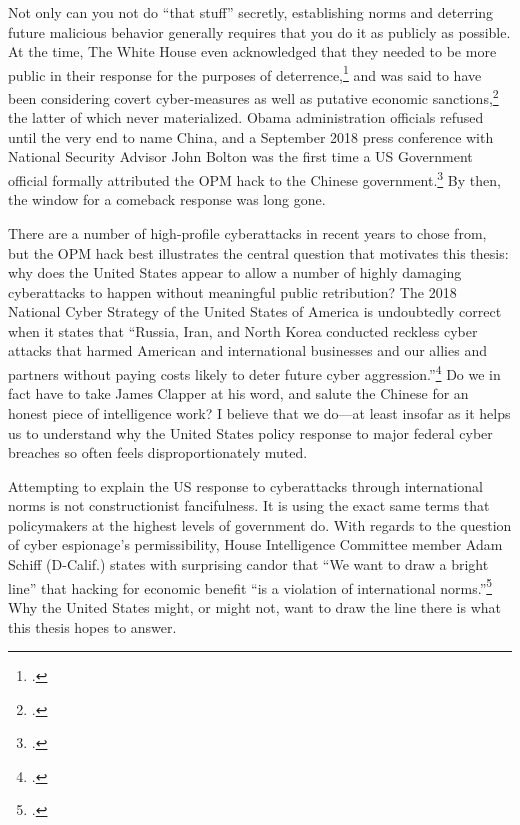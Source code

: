 \documentclass{report}
\begin{document}
\begin{refsegment}
Not only can you not do ``that stuff'' secretly, establishing norms and deterring future malicious behavior generally requires that you do it as publicly as possible. At the time, The White House even acknowledged that they needed to be more public in their response for the purposes of deterrence,\footcite{sanger_u.s._2017} and was said to have been considering covert cyber-measures as well as putative economic sanctions,\footcite{nakashima_hacks_2015} the latter of which never materialized. Obama administration officials refused until the very end to name China, and a September 2018 press conference with National Security Advisor John Bolton was the first time a US Government official formally attributed the OPM hack to the Chinese government.\footcite{sanger_trump_2018} By then, the window for a comeback response was long gone.

There are a number of high-profile cyberattacks in recent years to chose from, but the OPM hack best illustrates the central question that motivates this thesis: why does the United States appear to allow a number of highly damaging cyberattacks to happen without meaningful public retribution? The 2018 National Cyber Strategy of the United States of America is undoubtedly correct when it states that ``Russia, Iran, and North Korea conducted reckless cyber attacks that harmed American and international businesses and our allies and partners without paying costs likely to deter future cyber aggression.''\footcite{trump_national_2018} Do we in fact have to take James Clapper at his word, and salute the Chinese for an honest piece of intelligence work? I believe that we do---at least insofar as it helps us to understand why the United States policy response to major federal cyber breaches so often feels disproportionately muted.

Attempting to explain the US response to cyberattacks through international norms is not constructionist fancifulness. It is using the exact same terms that policymakers at the highest levels of government do. With regards to the question of cyber espionage's permissibility, House Intelligence Committee member Adam Schiff (D-Calif.) states with surprising candor that ``We want to draw a bright line” that hacking for economic benefit “is a violation of international norms.''\footcite{nakashima_hacks_2015} Why the United States might, or might not, want to draw the line there is what this thesis hopes to answer.







\end{refsegment}
\end{document}
